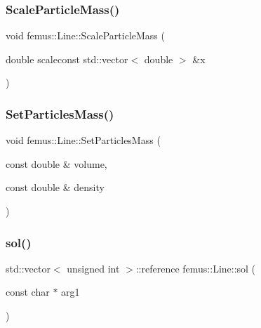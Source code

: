 \mbox{\label{classfemus_1_1_line_a9c671365287a5f89ee2682bcee9dbcc2}} 
\subsubsection{\texorpdfstring{Scale\+Particle\+Mass()}{ScaleParticleMass()}}
{\footnotesize\ttfamily void femus\+::\+Line\+::\+Scale\+Particle\+Mass (\begin{DoxyParamCaption}\item[{double }]{scaleconst std\+::vector$<$ double $>$ \&x }\end{DoxyParamCaption})}

\mbox{\label{classfemus_1_1_line_af55b5ea90edb20e5accc0c41aaeddddd}} 
\subsubsection{\texorpdfstring{Set\+Particles\+Mass()}{SetParticlesMass()}}
{\footnotesize\ttfamily void femus\+::\+Line\+::\+Set\+Particles\+Mass (\begin{DoxyParamCaption}\item[{const double \&}]{volume,  }\item[{const double \&}]{density }\end{DoxyParamCaption})}

\mbox{\label{classfemus_1_1_line_a6f026b817f6622d68af15ba6b9f72b58}} 
\subsubsection{\texorpdfstring{sol()}{sol()}}
{\footnotesize\ttfamily std\+::vector$<$ unsigned int $>$\+::reference femus\+::\+Line\+::sol (\begin{DoxyParamCaption}\item[{const char $\ast$}]{arg1 }\end{DoxyParamCaption})\hspace{0.3cm}{\ttfamily [protected]}}

